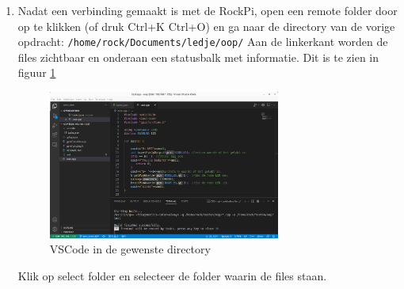 \begin{enumerate}
      \item Nadat een verbinding gemaakt is met de RockPi, open een remote folder door op  te klikken (of druk Ctrl+K Ctrl+O) en ga naar de directory van de vorige opdracht: \texttt{/home/rock/Documents/ledje/oop/} \newline
      Aan de linkerkant worden de files zichtbaar en onderaan een statusbalk met informatie. Dit is te zien in figuur \ref{fig:vncOp}
  		\begin{figure}[h!]
  	\centering
  	\begin{center} 	
  		\includegraphics[width=0.72\textwidth]{figuren/vncSchermOp1}
  		\caption{VSCode in de gewenste directory}
  		\label{fig:vncOp}   
  	\end{center}
  \end{figure}    

\newpage
Klik op select folder  %
en selecteer de folder waarin de files staan. 



\end{enumerate}
